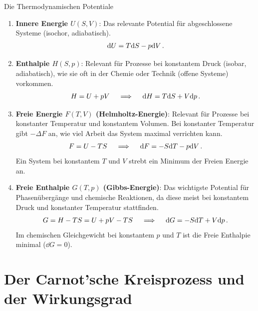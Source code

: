 \begin{importantbox}{Die Thermodynamischen Potentiale}
    \begin{enumerate}
        \item \textbf{Innere Energie $U(S,V)$}:
        Das relevante Potential für abgeschlossene Systeme (isochor, adiabatisch).
        \begin{equation}
            \mathrm{d} U = T\mathrm{d} S - p\mathrm{d} V \,.
        \end{equation}
        
        \item \textbf{Enthalpie $H(S,p)$}:
        Relevant für Prozesse bei konstantem Druck (isobar, adiabatisch), wie sie oft in der Chemie oder Technik (offene Systeme) vorkommen.
        \begin{equation}
            H = U + pV \quad \implies \quad \mathrm{d} H = T\mathrm{d} S + V\mathrm{d} p \,.
        \end{equation}
        
        \item \textbf{Freie Energie $F(T,V)$ (Helmholtz-Energie)}:
        Relevant für Prozesse bei konstanter Temperatur und konstantem Volumen. Bei konstanter Temperatur gibt $-\Delta F$ an, wie viel Arbeit das System maximal verrichten kann.
        \begin{equation}
            F = U - TS \quad \implies \quad \mathrm{d} F = -S\mathrm{d} T - p\mathrm{d} V \,.
        \end{equation}
        Ein System bei konstantem $T$ und $V$ strebt ein Minimum der Freien Energie an.
        
        \item \textbf{Freie Enthalpie $G(T,p)$ (Gibbs-Energie)}:
        Das wichtigste Potential für Phasenübergänge und chemische Reaktionen, da diese meist bei konstantem Druck und konstanter Temperatur stattfinden.
        \begin{equation}
            G = H - TS = U + pV - TS \quad \implies \quad \mathrm{d} G = -S\mathrm{d} T + V\mathrm{d} p \,.
        \end{equation}
        Im chemischen Gleichgewicht bei konstantem $p$ und $T$ ist die Freie Enthalpie minimal ($\dd G = 0$).
    \end{enumerate}
\end{importantbox}


\section{Der Carnot'sche Kreisprozess und der Wirkungsgrad}\label{sec: carnot_prozess}
